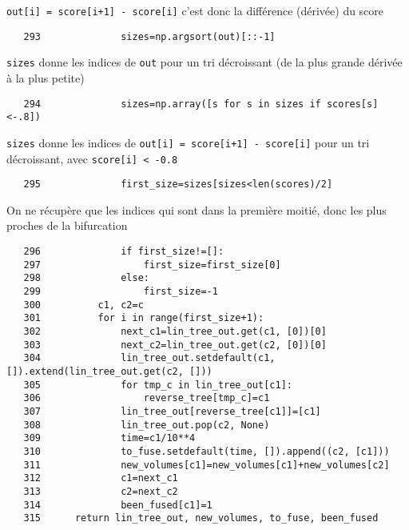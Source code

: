 \documentclass{article}
\def \mycolor {red}
\begin{document}
\color{\mycolor}
\verb|out[i] = score[i+1] - score[i]| c'est donc la diff\'erence (d\'eriv\'ee) du score
\color{black}
\begin{verbatim}
   293	            sizes=np.argsort(out)[::-1]
\end{verbatim} 
\color{\mycolor}
\verb|sizes| donne les indices de \verb|out| pour un tri d\'ecroissant (de la plus grande d\'eriv\'ee \`a la plus petite)
\color{black}
\begin{verbatim}
   294	            sizes=np.array([s for s in sizes if scores[s]<-.8])
\end{verbatim} 
\color{\mycolor}
\verb|sizes| donne les indices de \verb|out[i] = score[i+1] - score[i]| pour un tri d\'ecroissant, avec \verb|score[i] < -0.8|
\color{black}
\begin{verbatim}
   295	            first_size=sizes[sizes<len(scores)/2]
\end{verbatim} 
\color{\mycolor}
On ne r\'ecup\`ere que les indices qui sont dans la premi\`ere moiti\'e, donc les plus proches de la bifurcation
\color{black}
\begin{verbatim}
   296	            if first_size!=[]:
   297	                first_size=first_size[0]
   298	            else:
   299	                first_size=-1
   300	        c1, c2=c
   301	        for i in range(first_size+1):
   302	            next_c1=lin_tree_out.get(c1, [0])[0]
   303	            next_c2=lin_tree_out.get(c2, [0])[0]
   304	            lin_tree_out.setdefault(c1, []).extend(lin_tree_out.get(c2, []))
   305	            for tmp_c in lin_tree_out[c1]:
   306	                reverse_tree[tmp_c]=c1
   307	            lin_tree_out[reverse_tree[c1]]=[c1]
   308	            lin_tree_out.pop(c2, None)
   309	            time=c1/10**4
   310	            to_fuse.setdefault(time, []).append((c2, [c1]))
   311	            new_volumes[c1]=new_volumes[c1]+new_volumes[c2]
   312	            c1=next_c1
   313	            c2=next_c2
   314	            been_fused[c1]=1
   315	    return lin_tree_out, new_volumes, to_fuse, been_fused
\end{verbatim}



\end{document}
